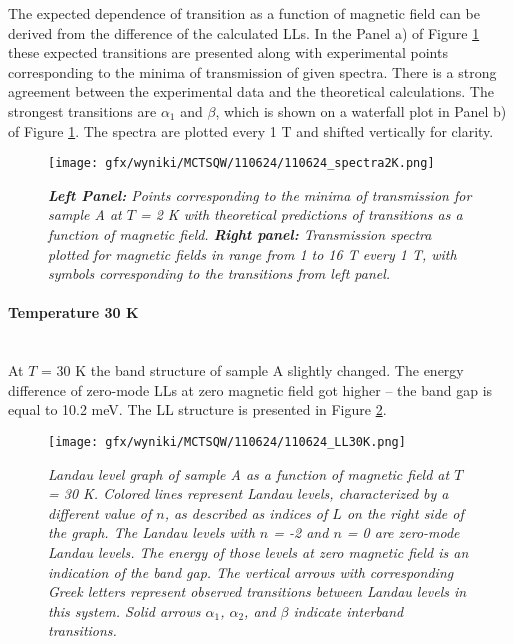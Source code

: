 \documentclass[titlepage,a4paper]{book}
\newcommand{\wciecie}{\quad\phantom{v}}
\newcommand{\myparagraph}[1]{\paragraph{#1}\mbox{}\\}
\begin{document}
The expected dependence of transition as a function of magnetic field can be derived from the difference of the calculated LLs. In the Panel a) of Figure \ref{fig:Spectra_110624_2K} these expected transitions are presented along with experimental points corresponding to the minima of transmission of given spectra. There is a strong agreement between the experimental data and the theoretical calculations. The strongest transitions are $\alpha_1$ and $\beta$, which is shown on a waterfall plot in Panel b) of Figure \ref{fig:Spectra_110624_2K}. The spectra are plotted every 1 T and shifted vertically for clarity.

\begin{figure}[H]
	\centering
	\texttt{[image: gfx/wyniki/MCTSQW/110624/110624\_spectra2K.png]}
	\vspace{-10pt}
	\caption{\textit{\textbf{Left Panel:} Points corresponding to the minima of transmission for sample A at $T$ = 2 K with theoretical predictions of transitions as a function of magnetic field. \textbf{Right panel:} Transmission spectra plotted for magnetic fields in range from 1 to 16 T every 1 T, with symbols corresponding to the transitions from left panel.}}
	\label{fig:Spectra_110624_2K}
\end{figure}

\clearpage
\myparagraph{Temperature 30 K}
\wciecie
At $T$ = 30 K the band structure of sample A slightly changed. The energy difference of zero-mode LLs at zero magnetic field got higher -- the band gap is equal to 10.2 meV. The LL structure is presented in Figure \ref{fig:LL_110624_30K}.

\begin{figure}[ht]
	\centering
	\texttt{[image: gfx/wyniki/MCTSQW/110624/110624\_LL30K.png]}
	\vspace{-10pt}
	\caption{\textit{Landau level graph of sample A as a function of magnetic field at $T$ = 30 K. Colored lines represent Landau levels, characterized by a different value of $n$, as described as indices of $L$ on the right side of the graph. The Landau levels with $n$ = -2 and $n$ = 0 are zero-mode Landau levels. The energy of those levels at zero magnetic field is an indication of the band gap. The vertical arrows with corresponding Greek letters represent observed transitions between Landau levels in this system. Solid arrows $\alpha_1$, $\alpha_2$, and $\beta$ indicate interband transitions.}}
	\label{fig:LL_110624_30K}
\end{figure}
\end{document}
